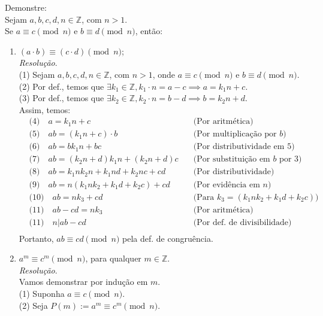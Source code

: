 Demonstre: \\
Sejam $a, b, c, d, n \in \mathbb{Z}$, com $n > 1$. \\
Se $a\equiv c \pmod{n}$ e $b\equiv d \pmod{n}$, então:
\begin{enumerate}
	\item $(a \cdot b)\equiv (c \cdot d) \pmod{n}$; \\
	\emph{Resolução}. \\
	(1) Sejam $a, b, c, d, n \in \mathbb{Z}$, com $n > 1$, onde $a\equiv c \pmod{n}$ e $b\equiv d \pmod{n}$. \\
	(2) Por def., temos que $\exists k_1 \in \mathbb{Z}, k_1 \cdot n = a - c \implies a = k_1n + c$. \\
	(3) Por def., temos que $\exists k_2 \in \mathbb{Z}, k_2 \cdot n = b - d \implies b = k_2n + d$. \\
	Assim, temos:
	\begin{align*}
		&\text{(4)} \quad a = k_1n + c &\quad \text{(Por aritmética)} \\
		&\text{(5)} \quad ab = (k_1n + c) \cdot b &\quad \text{(Por multiplicação por $b$)} \\
		&\text{(6)} \quad ab = bk_1n + bc &\quad \text{(Por distributividade em 5)} \\
		&\text{(7)} \quad ab = (k_2n + d)k_1n + (k_2n + d)c &\quad \text{(Por substituição em $b$ por 3)} \\
		&\text{(8)} \quad ab = k_1nk_2n + k_1nd + k_2nc + cd &\quad \text{(Por distributividade)} \\
		&\text{(9)} \quad ab = n (k_1nk_2 + k_1d + k_2c) + cd &\quad \text{(Por evidência em $n$)} \\
		&\text{(10)} \quad ab = nk_3 + cd &\quad \text{(Para $k_3 = (k_1nk_2 + k_1d + k_2c)$)} \\
		&\text{(11)} \quad ab - cd = nk_3 &\quad \text{(Por aritmética)} \\
		&\text{(11)} \quad n | ab - cd &\quad \text{(Por def. de divisibilidade)} \\
	\end{align*}
	Portanto, $ab \equiv cd \pmod{n}$ pela def. de congruência.
	\item $a^m \equiv c^m \pmod{n}$, para qualquer $m \in \mathbb{Z}$. \\
	\emph{Resolução}. \\
	Vamos demonstrar por indução em $m$. \\
		(1) Suponha $a \equiv c \pmod{n}$. \\
		(2) Seja $P(m) := a^m \equiv c^m \pmod{n}$. \\

\end{enumerate}
